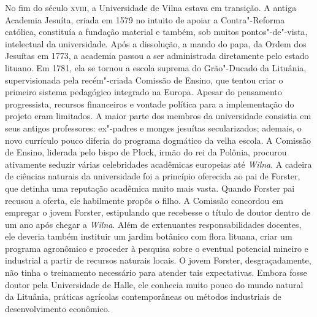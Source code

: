 \asterisc

No fim do século \textsc{xviii}, a Universidade de Vilna estava em transição. A
antiga Academia Jesuíta, criada em 1579 no intuito de apoiar a
Contra"-Reforma católica, constituía a fundação material e também, sob
muitos pontos"-de"-vista, intelectual da universidade. Após a dissolução,
a mando do papa, da Ordem dos Jesuítas em 1773, a academia passou a ser
administrada diretamente pelo estado lituano. Em 1781, ela se tornou a
escola suprema do Grão"-Ducado da Lituânia, supervisionada pela
recém"-criada Comissão de Ensino, que tentou criar o primeiro sistema
pedagógico integrado na Europa. Apesar do pensamento progressista,
recursos financeiros e vontade política para a implementação do projeto
eram limitados. A maior parte dos membros da universidade consistia em
seus antigos professores: ex"-padres e monges jesuítas secularizados;
ademais, o novo currículo pouco diferia do programa dogmático da velha
escola. A Comissão de Ensino, liderada pelo bispo de Płock, irmão do rei
da Polônia, procurou ativamente seduzir várias celebridades acadêmicas
europeias até \textit{Wilna}. A cadeira de ciências naturais da universidade foi
a princípio oferecida ao pai de Forster, que detinha uma reputação
acadêmica muito mais vasta. Quando Forster pai recusou a oferta, ele
habilmente propôs o filho. A Comissão concordou em empregar o jovem
Forster, estipulando que recebesse o título de doutor dentro de um ano
após chegar a \textit{Wilna}. Além de extenuantes responsabilidades docentes, ele
deveria também instituir um jardim botânico com flora lituana, criar um
programa agronômico e proceder à pesquisa sobre o eventual potencial
mineiro e industrial a partir de recursos naturais locais. O jovem
Forster, desgraçadamente, não tinha o treinamento necessário para
atender tais expectativas. Embora fosse doutor pela Universidade de
Halle, ele conhecia muito pouco do mundo natural da Lituânia, práticas
agrícolas contemporâneas ou métodos industriais de desenvolvimento
econômico.


